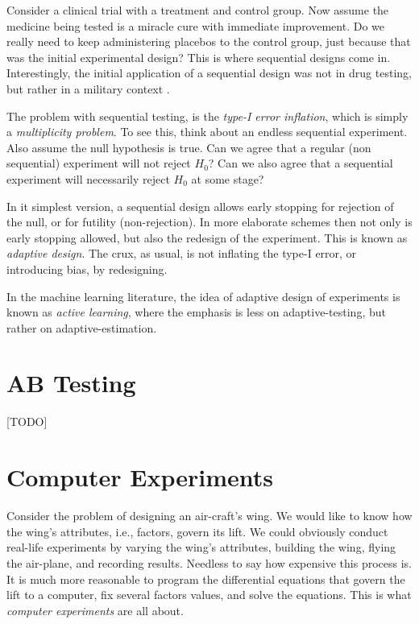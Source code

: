 Consider a clinical trial with a treatment and control group.
Now assume the medicine being tested is a miracle cure with immediate improvement. 
Do we really need to keep administering placebos to the control group, just because that was the initial experimental design?
This is where sequential designs come in.
Interestingly, the initial application of a sequential design was not in drug testing, but rather in a military context \citep{wald_sequential_1945}.

The problem with sequential testing, is the \emph{type-I error inflation}, which is simply a \emph{multiplicity problem}. 
To see this, think about an endless sequential experiment. Also assume the null hypothesis is true. 
Can we agree that a regular (non sequential) experiment will not reject $H_0$? 
Can we also agree that a sequential experiment will necessarily reject $H_0$ at some stage?

In it simplest version, a sequential design allows early stopping for rejection of the null, or for futility (non-rejection). 
In more elaborate schemes then not only is early stopping allowed, but also the redesign of the experiment. 
This is known as \emph{adaptive design}. The crux, as usual, is not inflating the type-I error, or introducing bias, by redesigning.


\begin{extra}
In the machine learning literature, the idea of adaptive design of experiments is known as \emph{active learning}, where the emphasis is less on adaptive-testing, but rather on adaptive-estimation.
\end{extra}


\section{AB Testing}
[TODO]




\section{Computer Experiments}
\begin{example}
\label{eg:wings}
Consider the problem of designing an air-craft's wing.
We would like to know how the wing's attributes, i.e., factors, govern its lift.
We could obviously conduct real-life experiments by varying the wing's attributes, building the wing, flying the air-plane, and recording results. 
Needless to say how expensive this process is.
It is much more reasonable to program the differential equations that govern the lift to a computer, fix several factors values, and solve the equations.
This is what \emph{computer experiments} are all about. 
\end{example}


